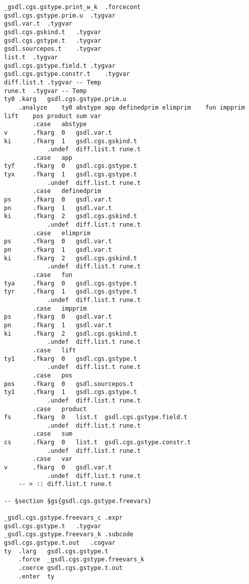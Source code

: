 \documentclass{report}
\begin{document}
\begin{verbatim}
_gsdl.cgs.gstype.print_w_k	.forcecont
gsdl.cgs.gstype.prim.u	.tygvar
gsdl.var.t	.tygvar
gsdl.cgs.gskind.t	.tygvar
gsdl.cgs.gstype.t	.tygvar
gsdl.sourcepos.t	.tygvar
list.t	.tygvar
gsdl.cgs.gstype.field.t	.tygvar
gsdl.cgs.gstype.constr.t	.tygvar
diff.list.t	.tygvar	-- Temp
rune.t	.tygvar	-- Temp
ty0	.karg	gsdl.cgs.gstype.prim.u
	.analyze	ty0	abstype	app	definedprim	elimprim	fun	impprim	lift	pos	product	sum	var
		.case	abstype
v		.fkarg	0	gsdl.var.t
ki		.fkarg	1	gsdl.cgs.gskind.t
			.undef	diff.list.t	rune.t
		.case	app
tyf		.fkarg	0	gsdl.cgs.gstype.t
tyx		.fkarg	1	gsdl.cgs.gstype.t
			.undef	diff.list.t	rune.t
		.case	definedprim
ps		.fkarg	0	gsdl.var.t
pn		.fkarg	1	gsdl.var.t
ki		.fkarg	2	gsdl.cgs.gskind.t
			.undef	diff.list.t	rune.t
		.case	elimprim
ps		.fkarg	0	gsdl.var.t
pn		.fkarg	1	gsdl.var.t
ki		.fkarg	2	gsdl.cgs.gskind.t
			.undef	diff.list.t	rune.t
		.case	fun
tya		.fkarg	0	gsdl.cgs.gstype.t
tyr		.fkarg	1	gsdl.cgs.gstype.t
			.undef	diff.list.t	rune.t
		.case	impprim
ps		.fkarg	0	gsdl.var.t
pn		.fkarg	1	gsdl.var.t
ki		.fkarg	2	gsdl.cgs.gskind.t
			.undef	diff.list.t	rune.t
		.case	lift
ty1		.fkarg	0	gsdl.cgs.gstype.t
			.undef	diff.list.t	rune.t
		.case	pos
pos		.fkarg	0	gsdl.sourcepos.t
ty1		.fkarg	1	gsdl.cgs.gstype.t
			.undef	diff.list.t	rune.t
		.case	product
fs		.fkarg	0	list.t	gsdl.cgs.gstype.field.t
			.undef	diff.list.t	rune.t
		.case	sum
cs		.fkarg	0	list.t	gsdl.cgs.gstype.constr.t
			.undef	diff.list.t	rune.t
		.case	var
v		.fkarg	0	gsdl.var.t
			.undef	diff.list.t	rune.t
	-- > :: diff.list.t	rune.t

-- §section §gs{gsdl.cgs.gstype.freevars}

_gsdl.cgs.gstype.freevars_c	.expr
gsdl.cgs.gstype.t	.tygvar
_gsdl.cgs.gstype.freevars_k	.subcode
gsdl.cgs.gstype.t.out	.cogvar
ty	.larg	gsdl.cgs.gstype.t
	.force	_gsdl.cgs.gstype.freevars_k
	.coerce	gsdl.cgs.gstype.t.out
	.enter	ty


\end{verbatim}
\end{document}
